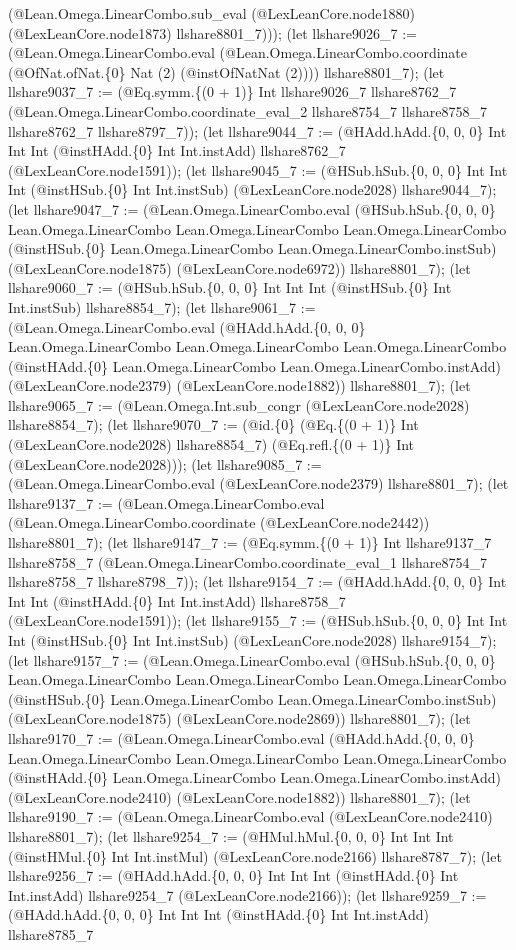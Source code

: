 \documentclass[11pt]{article}
\begin{document}
(@Lean.Omega.LinearCombo.sub\_eval (@LexLeanCore.node1880) (@LexLeanCore.node1873) llshare8801\_7))); (let llshare9026\_7 := (@Lean.Omega.LinearCombo.eval (@Lean.Omega.LinearCombo.coordinate (@OfNat.ofNat.\{0\} Nat (2) (@instOfNatNat (2)))) llshare8801\_7); (let llshare9037\_7 := (@Eq.symm.\{(0 + 1)\} Int llshare9026\_7 llshare8762\_7 (@Lean.Omega.LinearCombo.coordinate\_eval\_2 llshare8754\_7 llshare8758\_7 llshare8762\_7 llshare8797\_7)); (let llshare9044\_7 := (@HAdd.hAdd.\{0, 0, 0\} Int Int Int (@instHAdd.\{0\} Int Int.instAdd) llshare8762\_7 (@LexLeanCore.node1591)); (let llshare9045\_7 := (@HSub.hSub.\{0, 0, 0\} Int Int Int (@instHSub.\{0\} Int Int.instSub) (@LexLeanCore.node2028) llshare9044\_7); (let llshare9047\_7 := (@Lean.Omega.LinearCombo.eval (@HSub.hSub.\{0, 0, 0\} Lean.Omega.LinearCombo Lean.Omega.LinearCombo Lean.Omega.LinearCombo (@instHSub.\{0\} Lean.Omega.LinearCombo Lean.Omega.LinearCombo.instSub) (@LexLeanCore.node1875) (@LexLeanCore.node6972)) llshare8801\_7); (let llshare9060\_7 := (@HSub.hSub.\{0, 0, 0\} Int Int Int (@instHSub.\{0\} Int Int.instSub) llshare8854\_7); (let llshare9061\_7 := (@Lean.Omega.LinearCombo.eval (@HAdd.hAdd.\{0, 0, 0\} Lean.Omega.LinearCombo Lean.Omega.LinearCombo Lean.Omega.LinearCombo (@instHAdd.\{0\} Lean.Omega.LinearCombo Lean.Omega.LinearCombo.instAdd) (@LexLeanCore.node2379) (@LexLeanCore.node1882)) llshare8801\_7); (let llshare9065\_7 := (@Lean.Omega.Int.sub\_congr (@LexLeanCore.node2028) llshare8854\_7); (let llshare9070\_7 := (@id.\{0\} (@Eq.\{(0 + 1)\} Int (@LexLeanCore.node2028) llshare8854\_7) (@Eq.refl.\{(0 + 1)\} Int (@LexLeanCore.node2028))); (let llshare9085\_7 := (@Lean.Omega.LinearCombo.eval (@LexLeanCore.node2379) llshare8801\_7); (let llshare9137\_7 := (@Lean.Omega.LinearCombo.eval (@Lean.Omega.LinearCombo.coordinate (@LexLeanCore.node2442)) llshare8801\_7); (let llshare9147\_7 := (@Eq.symm.\{(0 + 1)\} Int llshare9137\_7 llshare8758\_7 (@Lean.Omega.LinearCombo.coordinate\_eval\_1 llshare8754\_7 llshare8758\_7 llshare8798\_7)); (let llshare9154\_7 := (@HAdd.hAdd.\{0, 0, 0\} Int Int Int (@instHAdd.\{0\} Int Int.instAdd) llshare8758\_7 (@LexLeanCore.node1591)); (let llshare9155\_7 := (@HSub.hSub.\{0, 0, 0\} Int Int Int (@instHSub.\{0\} Int Int.instSub) (@LexLeanCore.node2028) llshare9154\_7); (let llshare9157\_7 := (@Lean.Omega.LinearCombo.eval (@HSub.hSub.\{0, 0, 0\} Lean.Omega.LinearCombo Lean.Omega.LinearCombo Lean.Omega.LinearCombo (@instHSub.\{0\} Lean.Omega.LinearCombo Lean.Omega.LinearCombo.instSub) (@LexLeanCore.node1875) (@LexLeanCore.node2869)) llshare8801\_7); (let llshare9170\_7 := (@Lean.Omega.LinearCombo.eval (@HAdd.hAdd.\{0, 0, 0\} Lean.Omega.LinearCombo Lean.Omega.LinearCombo Lean.Omega.LinearCombo (@instHAdd.\{0\} Lean.Omega.LinearCombo Lean.Omega.LinearCombo.instAdd) (@LexLeanCore.node2410) (@LexLeanCore.node1882)) llshare8801\_7); (let llshare9190\_7 := (@Lean.Omega.LinearCombo.eval (@LexLeanCore.node2410) llshare8801\_7); (let llshare9254\_7 := (@HMul.hMul.\{0, 0, 0\} Int Int Int (@instHMul.\{0\} Int Int.instMul) (@LexLeanCore.node2166) llshare8787\_7); (let llshare9256\_7 := (@HAdd.hAdd.\{0, 0, 0\} Int Int Int (@instHAdd.\{0\} Int Int.instAdd) llshare9254\_7 (@LexLeanCore.node2166)); (let llshare9259\_7 := (@HAdd.hAdd.\{0, 0, 0\} Int Int Int (@instHAdd.\{0\} Int Int.instAdd) llshare8785\_7 
\end{document}
